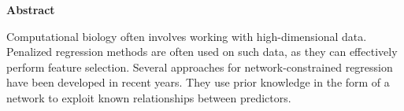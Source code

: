 \newpage
{\Huge \bf Abstract}
\vspace{24pt} 

Computational biology often involves working with high-dimensional data. Penalized regression methods are often used on such data, as they can effectively perform feature selection. Several approaches for network-constrained regression have been developed in recent years. They use prior knowledge in the form of a network to exploit known relationships between predictors.

\newpage
\vspace*{\fill}
